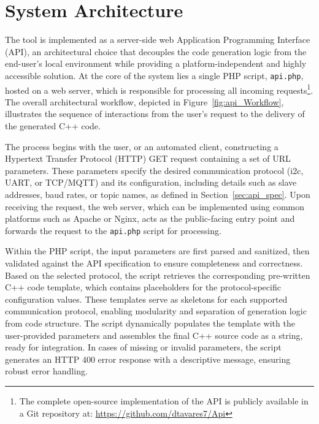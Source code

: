 
\section{System Architecture}
\label{sec:design_decisions}

The tool is implemented as a server-side web Application Programming Interface (API), an architectural choice that decouples the code generation logic from the end-user's local environment while providing a platform-independent and highly accessible solution. At the core of the system lies a single PHP script, \texttt{api.php}, hosted on a web server, which is responsible for processing all incoming requests\footnote{The complete open-source implementation of the API is publicly available in a Git repository at: \url{https://github.com/dtavares7/Api}}. The overall architectural workflow, depicted in Figure~\ref{fig:api_Workflow}, illustrates the sequence of interactions from the user's request to the delivery of the generated C++ code.

The process begins with the user, or an automated client, constructing a Hypertext Transfer Protocol (HTTP) GET request containing a set of URL parameters. These parameters specify the desired communication protocol (\gls{i2c}, UART, or TCP/MQTT) and its configuration, including details such as slave addresses, baud rates, or topic names, as defined in Section~\ref{sec:api_spec}. Upon receiving the request, the web server, which can be implemented using common platforms such as Apache or Nginx, acts as the public-facing entry point and forwards the request to the \texttt{api.php} script for processing.

Within the PHP script, the input parameters are first parsed and sanitized, then validated against the API specification to ensure completeness and correctness. Based on the selected protocol, the script retrieves the corresponding pre-written C++ code template, which contains placeholders for the protocol-specific configuration values. These templates serve as skeletons for each supported communication protocol, enabling modularity and separation of generation logic from code structure. The script dynamically populates the template with the user-provided parameters and assembles the final C++ source code as a string, ready for integration. In cases of missing or invalid parameters, the script generates an HTTP 400 error response with a descriptive message, ensuring robust error handling.

